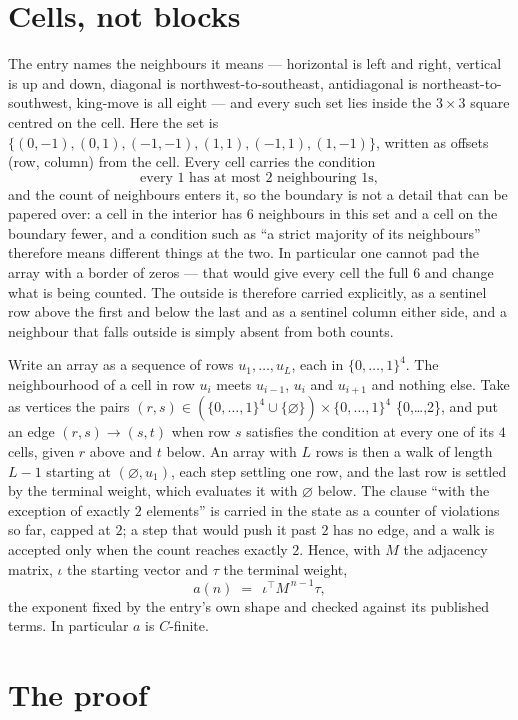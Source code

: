 \documentclass[11pt,a4paper]{article}
\theoremstyle{plain}
\theoremstyle{definition}
\begin{document}
\section{Cells, not blocks}

The entry names the neighbours it means --- horizontal is left and right, vertical is up and
down, diagonal is northwest-to-southeast, antidiagonal is northeast-to-southwest, king-move is
all eight --- and every such set lies inside the $3\times3$ square centred on the cell. Here
the set is $\{(0,-1), (0,1), (-1,-1), (1,1), (-1,1), (1,-1)\}$, written as offsets (row, column) from the cell. Every cell carries
the condition
\[
\text{every 1 has at most 2 neighbouring 1s},
\]
and the count of neighbours enters it, so the boundary is not a detail that can be papered
over: a cell in the interior has $6$ neighbours in this set and a cell on the boundary
fewer, and a condition such as ``a strict majority of its neighbours'' therefore means
different things at the two. In particular one cannot pad the array with a border of zeros ---
that would give every cell the full $6$ and change what is being counted. The outside is
therefore carried
explicitly, as a sentinel row above the first and below the last and as a sentinel column
either side, and a neighbour that falls outside is simply absent from both counts.

Write an array as a sequence of rows $u_1,\dots,u_L$, each in
$\{0,\dots,1\}^{4}$. The neighbourhood of a cell in row $u_i$ meets $u_{i-1}$,
$u_i$ and $u_{i+1}$ and nothing else. Take as vertices the pairs
$(r,s)\in(\{0,\dots,1\}^{4}\cup\{\varnothing\})\times\{0,\dots,1\}^{4}$ \times \{0,\dots,2\},
and put an edge $(r,s)\to(s,t)$ when row $s$ satisfies the condition at every one of its
$4$ cells, given $r$ above and $t$ below. An array with $L$ rows is then a walk of length
$L-1$ starting at $(\varnothing,u_1)$, each step settling one row, and the last row is
settled by the terminal weight, which evaluates it with $\varnothing$ below. The clause ``with the exception of exactly $2$ elements'' is carried in
the state as a counter of violations so far, capped at $2$; a step that would push it past
$2$ has no edge, and a walk is accepted only when the count reaches exactly $2$. Hence,
with $M$ the adjacency matrix, $\iota$ the starting vector and $\tau$ the terminal weight,
\[
a(n)\;=\;\,\iota^{\!\top}M^{\,n-1}\tau ,
\]
the exponent fixed by the entry's own shape and checked against its published terms. In
particular $a$ is $C$-finite.

\section{The proof}
\end{document}
